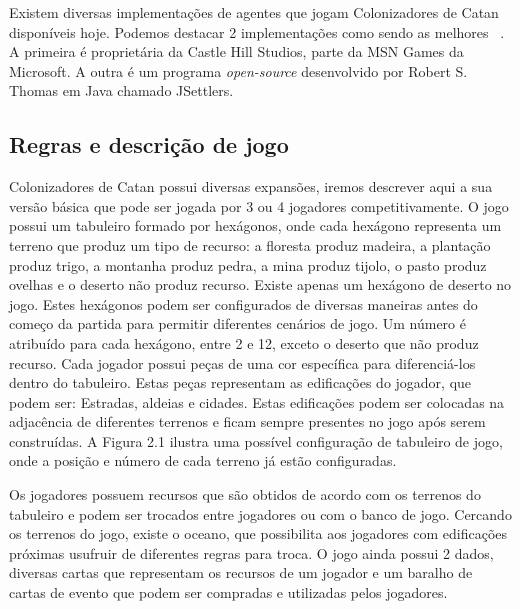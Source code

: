 Existem diversas implementações de agentes que jogam Colonizadores de Catan disponíveis hoje. Podemos destacar 2 implementações como sendo as melhores ~\cite{MONTECARLOCATAN01}. A primeira é proprietária da Castle Hill Studios, parte da MSN Games da Microsoft. A outra é um programa \textit{open-source} desenvolvido por Robert S. Thomas em Java chamado JSettlers.~\cite{Thomas:2002:JSR:502716.502779}




\subsection{\label{sec:secao2.1}Regras e descrição de jogo}

Colonizadores de Catan possui diversas expansões, iremos descrever aqui a sua versão básica que pode ser jogada por 3 ou 4 jogadores competitivamente. O jogo possui um tabuleiro formado por hexágonos, onde cada hexágono representa um terreno que produz um tipo de recurso: a floresta produz madeira, a plantação produz trigo, a montanha produz pedra, a mina produz tijolo, o pasto produz ovelhas e o deserto não produz recurso. Existe apenas um hexágono de deserto no jogo. Estes hexágonos podem ser configurados de diversas maneiras antes do começo da partida para permitir diferentes cenários de jogo. Um número é atribuído para cada hexágono, entre 2 e 12, exceto o deserto que não produz recurso. Cada jogador possui peças de uma cor específica para diferenciá-los dentro do tabuleiro. Estas peças representam as edificações do jogador, que podem ser: Estradas, aldeias e cidades. Estas edificações podem ser colocadas na adjacência de diferentes terrenos e ficam sempre presentes no jogo após serem construídas. A Figura 2.1 ilustra uma possível configuração de tabuleiro de jogo, onde a posição e número de cada terreno já estão configuradas.

Os jogadores possuem recursos que são obtidos de acordo com os terrenos do tabuleiro e podem ser trocados entre jogadores ou com o banco de jogo. Cercando os terrenos do jogo, existe o oceano, que possibilita aos jogadores com edificações próximas usufruir de diferentes regras para troca. O jogo ainda possui 2 dados, diversas cartas que representam os recursos de um jogador e um baralho de cartas de evento que podem ser compradas e utilizadas pelos jogadores.

